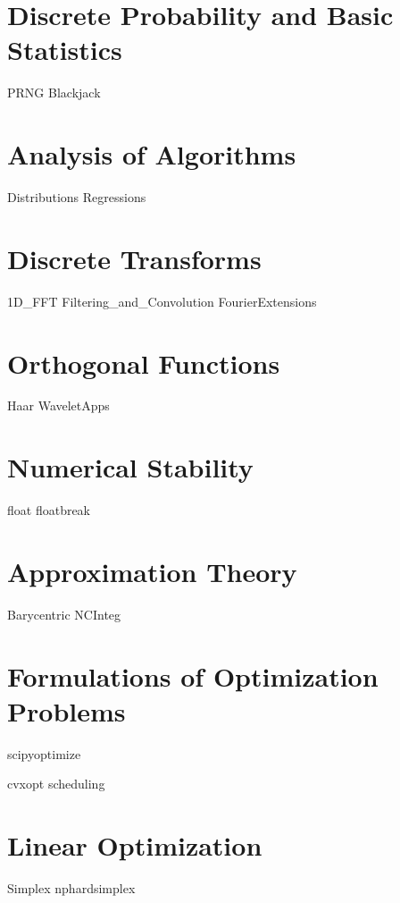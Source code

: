 \documentclass[nociteref]{newsiambook}
\begin{document}
\part{Discrete Probability and Basic Statistics}
{PRNG}
{Blackjack}


\part{Analysis of Algorithms}
{Distributions}
{Regressions}

\part{Discrete Transforms}
{1D_FFT}
{Filtering_and_Convolution}
{FourierExtensions}

\part{Orthogonal Functions}
{Haar}
{WaveletApps}

\part{Numerical Stability}
{float}
{floatbreak}

\part{Approximation Theory}
{Barycentric}
{NCInteg}

\part{Formulations of Optimization Problems}
{scipyoptimize}

{cvxopt}
{scheduling}

\part{Linear Optimization}
{Simplex}
{nphardsimplex}
\end{document}
